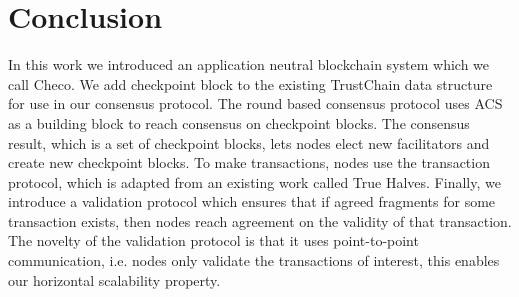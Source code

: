 \section{Conclusion}
\label{sec:conclusion}

In this work we introduced an application neutral blockchain system which we call Checo.
We add checkpoint block to the existing TrustChain data structure for use in our consensus protocol.
The round based consensus protocol uses ACS as a building block to reach consensus on checkpoint blocks.
The consensus result, which is a set of checkpoint blocks, lets nodes elect new facilitators and create new checkpoint blocks.
To make transactions, nodes use the transaction protocol,
which is adapted from an existing work called True Halves.
Finally, we introduce a validation protocol which ensures that if agreed fragments for some transaction exists,
then nodes reach agreement on the validity of that transaction.
The novelty of the validation protocol is that it uses point-to-point communication,
i.e. nodes only validate the transactions of interest,
this enables our horizontal scalability property.
